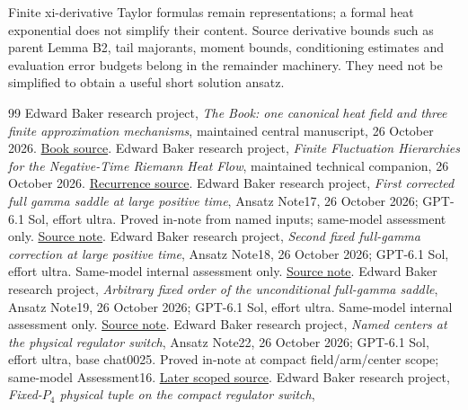\documentclass[11pt]{article}
\numberwithin{equation}{section}
\begin{document}
Finite xi-derivative Taylor formulas remain representations; a formal
heat exponential does not simplify their content. Source derivative
bounds such as parent Lemma B2, tail majorants, moment bounds,
conditioning estimates and evaluation error budgets belong in the
remainder machinery. They need not be simplified to obtain a useful
short solution ansatz.

\begin{thebibliography}{99}
 Edward Baker research project,
\emph{The Book: one canonical heat field and three finite approximation
mechanisms}, maintained central manuscript, 26 October 2026.
\href{../../../papers/investigations-5/01_heat_density_asymptotics/book/main.tex}{Book source}.
 Edward Baker research project,
\emph{Finite Fluctuation Hierarchies for the Negative-Time Riemann Heat
Flow}, maintained technical companion, 26 October 2026.
\href{../../../papers/investigations-5/01_heat_density_asymptotics/recurrence/manuscript/main.tex}{Recurrence source}.
 Edward Baker research project,
\emph{First corrected full gamma saddle at large positive time},
Ansatz Note17, 26 October 2026; GPT-6.1 Sol, effort ultra.
Proved in-note from named inputs; same-model assessment only.
\href{../../../papers/investigations-5/01_heat_density_asymptotics/ansatz/notes/17_FIRST_CORRECTED_LARGE_POSITIVE_TIME_20261026.md}{Source note}.
 Edward Baker research project,
\emph{Second fixed full-gamma correction at large positive time},
Ansatz Note18, 26 October 2026; GPT-6.1 Sol, effort ultra.
Same-model internal assessment only.
\href{../../../papers/investigations-5/01_heat_density_asymptotics/ansatz/notes/18_SECOND_CORRECTED_LARGE_POSITIVE_TIME_20261026.md}{Source note}.
 Edward Baker research project,
\emph{Arbitrary fixed order of the unconditional full-gamma saddle},
Ansatz Note19, 26 October 2026; GPT-6.1 Sol, effort ultra.
Same-model internal assessment only.
\href{../../../papers/investigations-5/01_heat_density_asymptotics/ansatz/notes/19_ARBITRARY_FIXED_POSITIVE_TIME_ORDER_20261026.md}{Source note}.
 Edward Baker research project,
\emph{Named centers at the physical regulator switch}, Ansatz Note22,
26 October 2026; GPT-6.1 Sol, effort ultra, base chat0025.
Proved in-note at compact field/arm/center scope; same-model Assessment16.
\href{../../../papers/investigations-5/01_heat_density_asymptotics/ansatz/notes/22_NAMED_SWITCH_CENTERS_20261026.md}{Later scoped source}.
 Edward Baker research project,
\emph{Fixed-$P_4$ physical tuple on the compact regulator switch},

\end{thebibliography}
\end{document}
